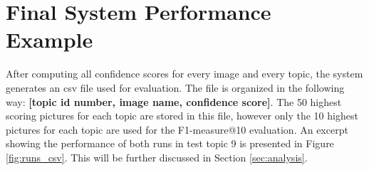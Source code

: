 \section{Final System Performance Example}
\label{sec:example}

After computing all confidence scores for every image and every topic, the system generates an csv file used for evaluation. The file is organized in the following way: \textbf{[topic id number, image name, confidence score]}. The 50 highest scoring pictures for each topic are stored in this file, however only the 10 highest pictures for each topic are used for the F1-measure@10 evaluation. An excerpt showing the performance of both runs in test topic 9 is presented in Figure \ref{fig:runs_csv}. This will be further discussed in Section \ref{sec:analysis}.


